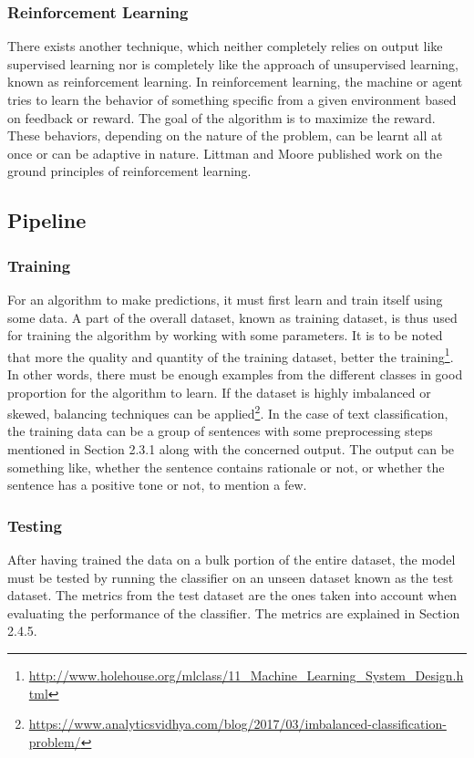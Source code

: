 \documentclass[a4paper,12pt,twoside]{report}
\begin{document}
\subsubsection{Reinforcement Learning} 
There exists another technique, which neither completely relies on output like supervised learning nor is completely like the approach of unsupervised learning, known as reinforcement learning. In reinforcement learning, the machine or agent tries to learn the behavior of something specific from a given environment based on feedback or reward. The goal of the algorithm is to maximize the reward. These behaviors, depending on the nature of the problem, can be learnt all at once or can be adaptive in nature. Littman and Moore \cite{Littman1996} published work on the ground principles of reinforcement learning. 

\subsection{Pipeline}

\subsubsection{Training} 
For an algorithm to make predictions, it must first learn and train itself using some data. A part of the overall dataset, known as training dataset, is thus used for training the algorithm by working with some parameters. It is to be noted that more the quality and quantity of the training dataset, better the training\footnote{\url{http://www.holehouse.org/mlclass/11_Machine_Learning_System_Design.html}}. In other words, there must be enough examples from the different classes in good proportion for the algorithm to learn.  If the dataset is highly imbalanced or skewed, balancing techniques can be applied\footnote{\url{https://www.analyticsvidhya.com/blog/2017/03/imbalanced-classification-problem/}}. In the case of text classification, the training data can be a group of sentences with some preprocessing steps mentioned in Section 2.3.1 along with the concerned output. The output can be something like, whether the sentence contains rationale or not, or whether the sentence has a positive tone or not, to mention a few.

\subsubsection{Testing} 
After having trained the data on a bulk portion of the entire dataset, the model must be tested by running the classifier on an unseen dataset known as the test dataset. The metrics from the test dataset are the ones taken into account when evaluating the performance of the classifier. The metrics are explained in Section 2.4.5. 
\end{document}
